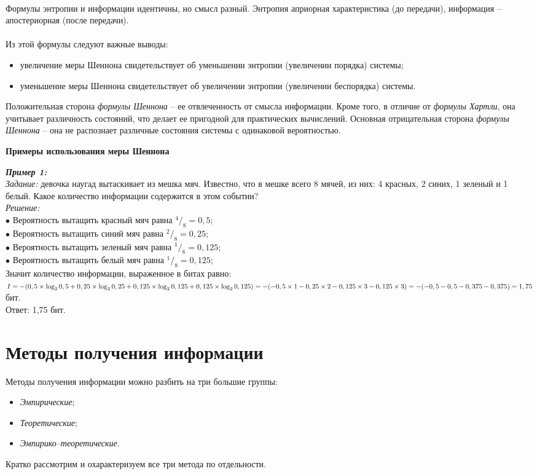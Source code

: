 \\Формулы энтропии и информации идентичны, но смысл разный. Энтропия априорная характеристика (до передачи), информация – апостериорная (после передачи).\\
\\Из этой формулы следуют важные выводы:
\begin{itemize}
\item увеличение меры Шеннона свидетельствует об уменьшении энтропии (увеличении порядка) системы;
\item уменьшение меры Шеннона свидетельствует об увеличении энтропии (увеличении беспорядка) системы.
\end{itemize}
Положительная сторона \emph{формулы Шеннона} – ее отвлеченность от смысла информации. Кроме того, в отличие от \emph{формулы Хартли}, она учитывает различность состояний, что делает ее пригодной для практических вычислений. Основная отрицательная сторона \emph{формулы Шеннона} – она не распознает различные состояния системы с одинаковой вероятностью.

\begin{center}
\textbf{Примеры использования меры Шеннона}
\end{center}
\emph{\textbf{Пример 1:}}
\\\emph{Задание:} девочка наугад вытаскивает из мешка мяч. Известно, что в мешке всего 8 мячей, из них: 4 красных, 2 синих, 1 зеленый и 1 белый. Какое количество информации содержится в этом событии?
\\\emph{Решение:}
\\$\bullet$ Вероятность вытащить красный мяч равна $^4/_8 = 0,5$;
\\$\bullet$ Вероятность вытащить синий мяч равна $^2/_8 = 0,25$;
\\$\bullet$ Вероятность вытащить зеленый мяч равна $^1/_8 = 0,125$;
\\$\bullet$ Вероятность вытащить белый мяч равна $^1/_8 = 0,125$;
\\Значит количество информации, выраженное в битах равно: $I = -(0,5\hm\times \log_{2}0,5\hm + 0,25\hm\times \log_{2}0,25 + 0,125\hm\times \log_{2}0,125\hm + 0,125\hm\times \log_{2}0,125) \hm = -(-0,5\times 1 - 0,25\times 2 - 0,125\times 3 - 0,125\times 3) = -(-0,5 - 0,5\hm - 0,375\hm - 0,375\hm) = 1,75$ бит.
\\Ответ: 1,75 бит.

\section{Методы получения информации}
Методы получения информации можно разбить на три большие группы:
\begin{itemize}
\item \emph{Эмпирические};
\item \emph{Теоретические}; 
\item \emph{Эмпирико--теоретические}.
\end{itemize}
Кратко рассмотрим и охарактеризуем все три метода по отдельности. 
